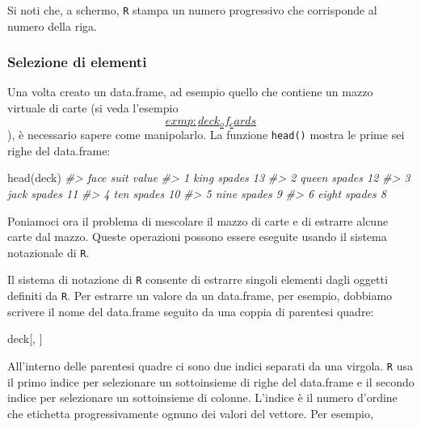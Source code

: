 \documentclass[
]{memoir}
\newenvironment{Shaded}{\begin{snugshade}}{\end{snugshade}}
\newcommand{\CommentTok}[1]{\textcolor[rgb]{0.56,0.35,0.01}{\textit{#1}}}
\newcommand{\FunctionTok}[1]{\textcolor[rgb]{0.00,0.00,0.00}{#1}}
\newcommand{\NormalTok}[1]{#1}
\theoremstyle{definition}
\theoremstyle{definition}
\theoremstyle{definition}
\theoremstyle{definition}
\theoremstyle{remark}
\begin{document}
Si noti che, a schermo, \texttt{R} stampa un numero progressivo che corrisponde
al numero della riga.

\hypertarget{selezione-di-elementi}{%
\subsubsection{Selezione di elementi}\label{selezione-di-elementi}}

Una volta creato un data.frame, ad esempio quello che contiene un mazzo
virtuale di carte (si veda
l'esempio~\protect\hyperlink{exmp:deck_of_cards}{\[exmp:deck_of_cards\]}), è necessario sapere come manipolarlo.
La funzione \texttt{head()} mostra le prime sei righe del data.frame:

\begin{Shaded}
\begin{Highlighting}[]
\FunctionTok{head}\NormalTok{(deck)}
\CommentTok{\#\textgreater{}    face   suit value}
\CommentTok{\#\textgreater{} 1  king spades    13}
\CommentTok{\#\textgreater{} 2 queen spades    12}
\CommentTok{\#\textgreater{} 3  jack spades    11}
\CommentTok{\#\textgreater{} 4   ten spades    10}
\CommentTok{\#\textgreater{} 5  nine spades     9}
\CommentTok{\#\textgreater{} 6 eight spades     8}
\end{Highlighting}
\end{Shaded}

Poniamoci ora il problema di mescolare il mazzo di carte e di estrarre
alcune carte dal mazzo. Queste operazioni possono essere eseguite usando
il sistema notazionale di \texttt{R}.

Il sistema di notazione di \texttt{R} consente di estrarre singoli elementi
dagli oggetti definiti da \texttt{R}. Per estrarre un valore da un data.frame,
per esempio, dobbiamo scrivere il nome del data.frame seguito da una
coppia di parentesi quadre:

\begin{Shaded}
\begin{Highlighting}[]
\NormalTok{deck[, ]}
\end{Highlighting}
\end{Shaded}

All'interno delle parentesi quadre ci sono due indici separati da una
virgola. \texttt{R} usa il primo indice per selezionare un sottoinsieme di righe
del data.frame e il secondo indice per selezionare un sottoinsieme di
colonne. L'indice è il numero d'ordine che etichetta progressivamente ognuno dei valori del vettore. Per esempio,
\end{document}
